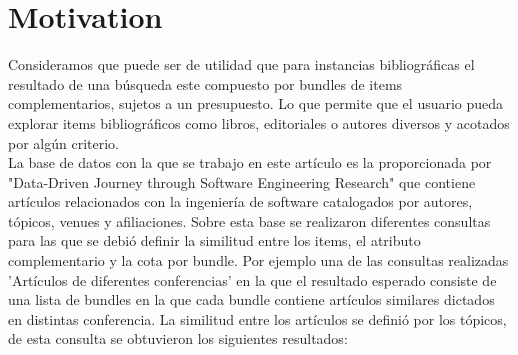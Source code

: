 \section{Motivation}
Consideramos que puede ser de utilidad que para instancias bibliográficas el resultado de una búsqueda este compuesto por bundles de items complementarios, sujetos a un presupuesto. 
Lo que permite que el usuario pueda explorar items bibliográficos como libros, editoriales o autores diversos y acotados por algún criterio.\\
La base de datos con la que se trabajo en este artículo es la proporcionada por "Data-Driven Journey through Software Engineering Research" que contiene artículos relacionados con la ingeniería de software catalogados por autores, tópicos, venues y afiliaciones. Sobre esta base se realizaron diferentes consultas para las que se debió definir la similitud entre los items, el atributo complementario y la cota por bundle. Por ejemplo una de las consultas realizadas 'Artículos de diferentes conferencias'
en la que el resultado esperado consiste de una lista de bundles en la que cada bundle contiene artículos similares dictados en distintas conferencia. La similitud entre los artículos se definió por los tópicos, de esta consulta se obtuvieron los siguientes resultados: